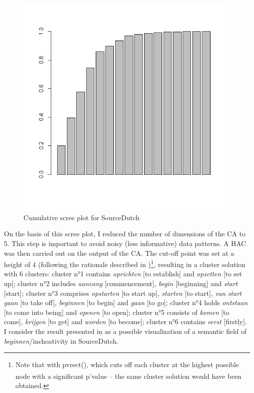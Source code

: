 \begin{figure}
\includegraphics[height=.4\textheight]{figures/Vandevoorde2-img51.png}
\caption{\label{fig:4:51}  Cumulative scree plot for SourceDutch}
\end{figure}

On the basis of this scree plot, I reduced the number of dimensions of the CA to 5. This step is important to avoid noisy (less informative) data patterns. A HAC was then carried out on the output of the CA. The cut-off point was set at a height of 4 (following the rationale described in )\footnote{Note that with pvrect(), which cuts off each cluster at the highest possible node with a significant p\textsuperscript{{}-}value – the same cluster solution would have been obtained.}, resulting in a cluster solution with 6 clusters: cluster n°1 contains \textit{oprichten} [to establish] and \textit{opzetten} [to set up]; cluster n°2 includes \textit{aanvang} [commencement], \textit{begin} [beginning] and \textit{start} [start]; cluster n°3 comprises \textit{opstarten} [to start up], \textit{starten} [to start], \textit{van} \textit{start} \textit{gaan} [to take off], \textit{beginnen} [to begin] and \textit{gaan} [to go]; cluster n°4 holds \textit{ontstaan} [to come into being] and \textit{openen} [to open]; cluster n°5 consists of \textit{komen} [to come], \textit{krijgen} [to get] and \textit{worden} [to become]; cluster n°6 contains \textit{eerst} [firstly]. I consider the result presented in  as a possible visualization of a semantic field of \textit{beginnen}/inchoativity in SourceDutch.

